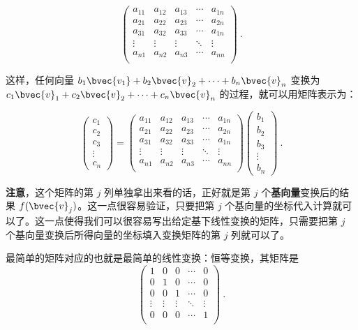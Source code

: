\begin{equation}
    \begin{pmatrix}
    a_{11}&a_{12}&a_{13}&\cdots&a_{1n}\\
    a_{21}&a_{22}&a_{23}&\cdots&a_{2n}\\
    a_{31}&a_{32}&a_{33}&\cdots&a_{1n}\\
    \vdots&\vdots&\vdots&\ddots&\vdots\\
    a_{n1}&a_{n2}&a_{n3}&\cdots&a_{nn}\\
    \end{pmatrix}~.
\end{equation}

这样，任何向量 $b_1\bvec{v_1}+b_2\bvec{v}_2+\cdots+b_n\bvec{v}_n$ 变换为 $c_1\bvec{v}_1+c_2\bvec{v}_2+\cdots+c_n\bvec{v}_n$ 的过程，就可以用矩阵表示为：

\begin{equation}
\begin{pmatrix}
c_1\\c_2\\c_3\\\vdots\\c_n
\end{pmatrix}
=
    \begin{pmatrix}
    a_{11}&a_{12}&a_{13}&\cdots&a_{1n}\\
    a_{21}&a_{22}&a_{23}&\cdots&a_{2n}\\
    a_{31}&a_{32}&a_{33}&\cdots&a_{1n}\\
    \vdots&\vdots&\vdots&\ddots&\vdots\\
    a_{n1}&a_{n2}&a_{n3}&\cdots&a_{nn}\\
    \end{pmatrix}
    \begin{pmatrix}
    b_1\\b_2\\b_3\\\vdots\\b_n
    \end{pmatrix}~.
\end{equation}

\textbf{注意}，这个矩阵的第 $j$ 列单独拿出来看的话，正好就是第 $j$ 个\textbf{基向量}变换后的结果 $f(\bvec{v}_j)$。这一点很容易验证，只要把第 $j$ 个基向量的坐标代入计算就可以了。这一点使得我们可以很容易写出给定基下线性变换的矩阵，只需要把第 $j$ 个基向量变换后所得向量的坐标填入变换矩阵的第 $j$ 列就可以了。

最简单的矩阵对应的也就是最简单的线性变换：恒等变换，其矩阵是
\begin{equation}
    \begin{pmatrix}
1&0&0&\cdots&0\\
0&1&0&\cdots&0\\
0&0&1&\cdots&0\\
\vdots&\vdots&\vdots&\ddots&\vdots\\
0&0&0&\cdots&1\\
    \end{pmatrix}~.
\end{equation}


